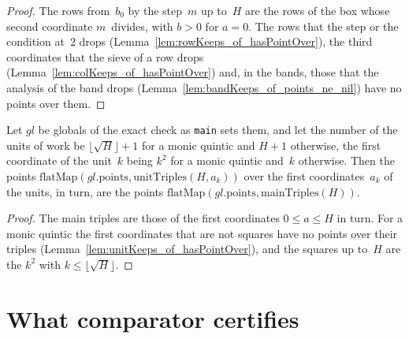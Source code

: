 \begin{proof}
  \leanok
  The rows from~$b_0$ by the step~$m$ up to~$H$ are the rows of the box whose second coordinate
  $m$~divides, with $b > 0$ for $a = 0$. The rows that the step or the condition at~$2$ drops
  (Lemma~\ref{lem:rowKeeps_of_hasPointOver}), the third coordinates that the sieve of a row drops
  (Lemma~\ref{lem:colKeeps_of_hasPointOver}) and, in the bands, those that the analysis of the band
  drops (Lemma~\ref{lem:bandKeeps_of_points_ne_nil}) have no points over them.
\end{proof}

\begin{lemma}\label{lem:flatMap_range_unitTriples_unitA}
  \leanok
  Let $\mathit{gl}$ be globals of the exact check as \texttt{main} sets them, and let the number of
  the units of work be $\lfloor\sqrt{H}\rfloor + 1$ for a monic quintic and $H + 1$ otherwise, the
  first coordinate of the unit~$k$ being $k^2$ for a monic quintic and~$k$ otherwise. Then the
  points $\mathrm{flatMap}(\mathit{gl}.\mathrm{points}, \mathrm{unitTriples}(H, a_k))$ over the
  first coordinates~$a_k$ of the units, in turn, are the points $\mathrm{flatMap}(\mathit{gl}.\mathrm{points},
  \mathrm{mainTriples}(H))$.
\end{lemma}

\begin{proof}
  \leanok
  The main triples are those of the first coordinates $0 \le a \le H$ in turn. For a monic quintic
  the first coordinates that are not squares have no points over their triples
  (Lemma~\ref{lem:unitKeeps_of_hasPointOver}), and the squares up to~$H$ are the $k^2$ with
  $k \le \lfloor\sqrt{H}\rfloor$.
\end{proof}

\section{What comparator certifies}\label{sec:comparator}

